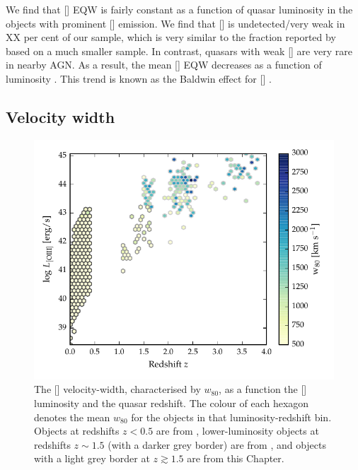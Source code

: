 We find that [] EQW is fairly constant as a function of quasar luminosity in the objects with prominent [] emission. 
We find that [] is undetected/very weak in XX per cent of our sample, which is very similar to the fraction reported by \citet{netzer04} based on a much smaller sample.  
In contrast, quasars with weak [] are very rare in nearby AGN. 
As a result, the mean [] EQW decreases as a function of luminosity \citep[e.g.][]{brotherton96,netzer04,sulentic04,baskin05b}. 
This trend is known as the Baldwin effect for [] \citep[e.g.][]{baldwin77,brotherton96,zhang11,stern12}. 

\subsection{Velocity width}

\begin{figure}[t!]
    \includegraphics[width=\columnwidth]{figures/chapter04/oiii_luminosity_z_w80.pdf} 
    \caption[{The [] velocity-width, characterised by $w_{80}$, as a function the [] luminosity and the quasar redshift.}]{The [] velocity-width, characterised by $w_{80}$, as a function the [] luminosity and the quasar redshift. The colour of each hexagon denotes the mean $w_{80}$ for the objects in that luminosity-redshift bin. Objects at redshifts $z<0.5$ are from \citet{mullaney13}, lower-luminosity objects at redshifts $z\sim1.5$ (with a darker grey border) are from \citet{harrison16}, and objects with a light grey border at $z \gtrsim 1.5$ are from this Chapter.}       
    \label{fig:oiii_luminosity_z_w80}
\end{figure}

